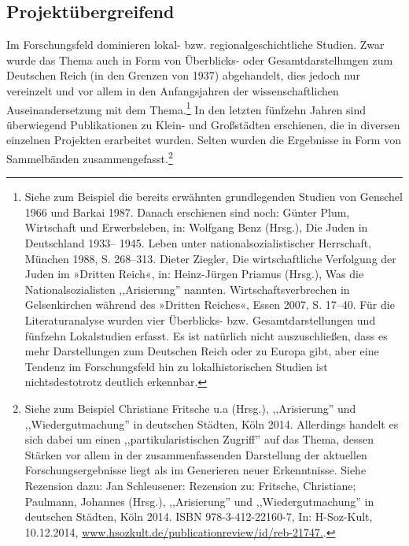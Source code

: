 \subsection{Projektübergreifend}

Im Forschungsfeld dominieren lokal- bzw. regionalgeschichtliche Studien. Zwar wurde das Thema auch in Form von Überblicks- oder Gesamtdarstellungen zum Deutschen Reich (in den Grenzen von 1937) abgehandelt, dies jedoch nur vereinzelt und vor allem in den Anfangsjahren der wissenschaftlichen Auseinandersetzung mit dem Thema.\footnote{Siehe zum Beispiel die bereits erwähnten grundlegenden Studien von Genschel 1966 und Barkai 1987. Danach erschienen sind noch: Günter
Plum, Wirtschaft und Erwerbsleben, in: Wolfgang Benz (Hrsg.), Die Juden in Deutschland 1933–
1945. Leben unter nationalsozialistischer Herrschaft, München 1988, S. 268–313. Dieter Ziegler, Die wirtschaftliche
Verfolgung der Juden im »Dritten Reich«, in: Heinz-Jürgen Priamus (Hrsg.), Was die
Nationalsozialisten ,,Arisierung'' nannten. Wirtschaftsverbrechen in Gelsenkirchen während des
»Dritten Reiches«, Essen 2007, S. 17–40. Für die Literaturanalyse wurden vier Überblicks- bzw. Gesamtdarstellungen und fünfzehn Lokalstudien erfasst. Es ist natürlich nicht auszuschließen, dass es mehr Darstellungen zum Deutschen Reich oder zu Europa gibt, aber eine Tendenz im Forschungsfeld hin zu lokalhistorischen Studien ist nichtsdestotrotz deutlich erkennbar.} In den letzten fünfzehn Jahren sind überwiegend Publikationen zu Klein- und Großstädten erschienen, die in diversen einzelnen Projekten erarbeitet wurden. Selten wurden die Ergebnisse in Form von Sammelbänden zusammengefasst.\footnote{Siehe zum Beispiel Christiane Fritsche u.a (Hrsg.), ,,Arisierung'' und ,,Wiedergutmachung'' in deutschen Städten, Köln 2014. Allerdings handelt es sich dabei um einen ,,partikularistischen Zugriff'' auf das Thema, dessen Stärken vor allem in der zusammenfassenden Darstellung der aktuellen Forschungsergebnisse liegt als im Generieren neuer Erkenntnisse. Siehe Rezension dazu: Jan Schleusener: Rezension zu: Fritsche, Christiane; Paulmann, Johannes (Hrsg.), ,,Arisierung'' und ,,Wiedergutmachung'' in deutschen Städten, Köln  2014. ISBN 978-3-412-22160-7, In: H-Soz-Kult, 10.12.2014, \url{www.hsozkult.de/publicationreview/id/reb-21747.}.} 

